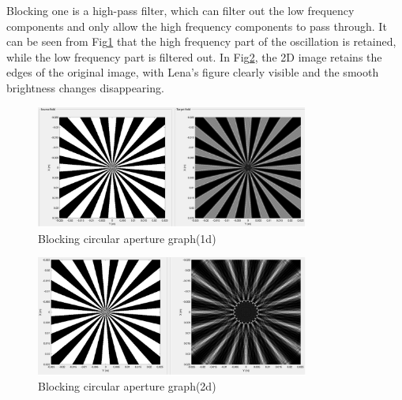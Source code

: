 \documentclass[fontsize=11pt]{scrartcl}
\begin{document}
Blocking one is a high-pass filter, which can filter out the low frequency components 
and only allow the high frequency components to pass through. 
It can be seen from Fig\ref{fig4.3} that the high frequency part of the oscillation is 
retained, while the low frequency part is filtered out. 
In Fig\ref{fig4.4}, the 2D image retains the edges of the original image, 
with Lena’s figure clearly visible and the smooth brightness changes disappearing.
\begin{figure}[H]
    \centering
     \includegraphics[width=0.8\textwidth]{img/7_3.png}
     \caption{Blocking circular aperture graph(1d)}
     \label{fig4.3}
\end{figure}
\begin{figure}[H]
    \centering
     \includegraphics[width=0.8\textwidth]{img/7_4.png}
     \caption{Blocking circular aperture graph(2d)}
     \label{fig4.4}
\end{figure}
\pagebreak
\end{document}
